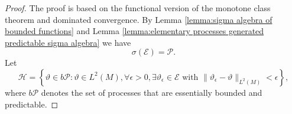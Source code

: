 \documentclass[11pt,a4paper,twoside,openany]{report}
\numberwithin{equation}{section}
\theoremstyle{plain} %
\theoremstyle{definition} %
\theoremstyle{remark} %
\begin{document}
\begin{proof}
    The proof is based on the functional version of the monotone class theorem and dominated convergence. By Lemma \ref{lemma:sigma algebra of bounded functions} and Lemma \ref{lemma:elementary processes generated predictable sigma algebra} we have 
    \begin{equation*}
        \sigma(\mathcal{E})=\mathcal{P}.
    \end{equation*}
    Let 
    \begin{equation*}
        \mathcal{H}=\left\{ \vartheta\in b\mathcal{P}:\vartheta\in L^2(M),\forall \epsilon>0, \exists \vartheta_{\epsilon}\in \mathcal{E}\text{ with }\lVert \vartheta_{\epsilon}-\vartheta\rVert_{L^2(M)}<\epsilon\right\},
    \end{equation*}
    where \(b\mathcal{P}\) denotes the set of processes that are essentially bounded and predictable.


\end{proof}
\end{document}
